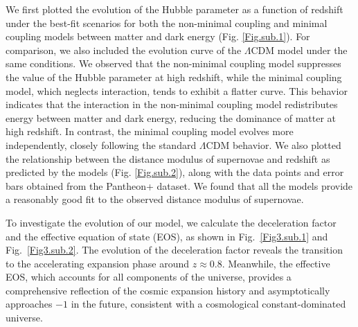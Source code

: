 \documentclass[a4paper,fleqn]{cas-sc}
\begin{document}
We first plotted the evolution of the Hubble parameter as a function of redshift under the best-fit scenarios for both the non-minimal coupling and minimal coupling models between matter and dark energy (Fig. \ref{Fig.sub.1}). For comparison, we also included the evolution curve of the $\Lambda$CDM model under the same conditions. We observed that the non-minimal coupling model suppresses the value of the Hubble parameter at high redshift, while the minimal coupling model, which neglects interaction, tends to exhibit a flatter curve. This behavior indicates that the interaction in the non-minimal coupling model redistributes energy between matter and dark energy, reducing the dominance of matter at high redshift. In contrast, the minimal coupling model evolves more independently, closely following the standard $\Lambda$CDM behavior. We also plotted the relationship between the distance modulus of supernovae and redshift as predicted by the models (Fig. \ref{Fig.sub.2}), along with the data points and error bars obtained from the Pantheon+ dataset. We found that all the models provide a reasonably good fit to the observed distance modulus of supernovae. 

To investigate the evolution of our model, we calculate the deceleration factor and the effective equation of state (EOS), as shown in Fig.~\ref{Fig3.sub.1} and Fig.~\ref{Fig3.sub.2}. The evolution of the deceleration factor reveals the transition to the accelerating expansion phase around $z \approx 0.8$. Meanwhile, the effective EOS, which accounts for all components of the universe, provides a comprehensive reflection of the cosmic expansion history and asymptotically approaches $-1$ in the future, consistent with a cosmological constant-dominated universe.
\end{document}
